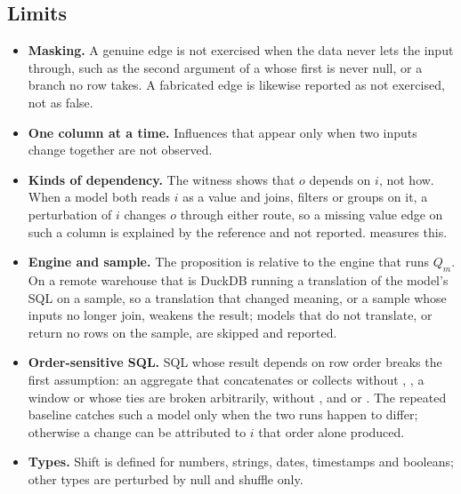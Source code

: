 \subsection{Limits}

\begin{itemize}
  \item \textbf{Masking.} A genuine edge is not exercised when the data never lets the input
  through, such as the second argument of a  whose first is never null, or a
   branch no row takes. A fabricated edge is likewise reported as not exercised, not
  as false.
  \item \textbf{One column at a time.} Influences that appear only when two inputs change together
  are not observed.
  \item \textbf{Kinds of dependency.} The witness shows that $o$ depends on $i$, not how. When a
  model both reads $i$ as a value and joins, filters or groups on it, a perturbation of $i$
  changes $o$ through either route, so a missing value edge on such a column is explained by the
  reference and not reported.  measures this.
  \item \textbf{Engine and sample.} The proposition is relative to the engine that runs $Q_m$. On
  a remote warehouse that is DuckDB running a translation of the model's SQL on a sample, so a
  translation that changed meaning, or a sample whose inputs no longer join, weakens the result;
  models that do not translate, or return no rows on the sample, are skipped and reported.
  \item \textbf{Order-sensitive SQL.} SQL whose result depends on row order breaks the first
  assumption: an aggregate that concatenates or collects without ,
  , a window or  whose ties are broken arbitrarily,
   without , and  or . The repeated baseline
  catches such a model only when the two runs happen to differ; otherwise a change can be
  attributed to $i$ that order alone produced.
  \item \textbf{Types.} Shift is defined for numbers, strings, dates, timestamps and booleans;
  other types are perturbed by null and shuffle only.
\end{itemize}
